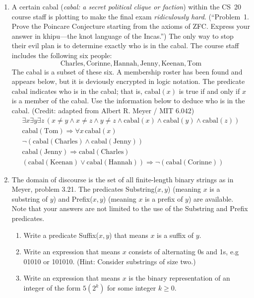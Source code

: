 \documentclass[12pt]{article}
\newcommand{\cabal}{\text{cabal}}
\newcommand{\PersonA}{\text{Charles}}
\newcommand{\PersonB}{\text{Corinne}}
\newcommand{\PersonC}{\text{Hannah}}
\newcommand{\PersonD}{\text{Jenny}}
\newcommand{\PersonE}{\text{Keenan}}
\newcommand{\PersonF}{\text{Tom}}
\begin{document}
\begin{enumerate}
\item A certain cabal (\emph{cabal: a secret political clique or faction})
 within the CS~20 course staff is
plotting to make the final exam \emph{ridiculously hard}.
(``Problem~1.  Prove the Poincare Conjecture starting from the axioms
of ZFC.  Express your answer in khipu---the knot language of the
Incas.'')  The only way to stop their evil plan is to determine
exactly who is in the cabal.  The course staff includes the following six
people: \[
\PersonA,\PersonB,\PersonC,\PersonD,\PersonE,\PersonF \]
The cabal is a subset of these six.  A membership roster has been
found and appears below, but it is deviously encrypted in logic
notation.  The predicate $\cabal$ indicates who is in the cabal; that is,
$\cabal(x)$ is true if and only if $x$ is a member of the cabal.  Use the information below 
to deduce who is in the cabal. (Credit: adapted from Albert R. Meyer / MIT 6.042)
\begin{gather}
\exists x\exists y\exists z \,
    (x \neq y \wedge
     x \neq z \wedge
     y \neq z \wedge
     \cabal(x) \wedge \cabal(y) \wedge \cabal(z))
\\
\cabal(\PersonF) \Rightarrow \forall x\, \cabal(x) \\ \lnot(\cabal(\PersonA) \wedge \cabal(\PersonD)) \\
\cabal(\PersonD) \Rightarrow \cabal(\PersonA)\\
(\cabal(\PersonE) \vee \cabal(\PersonC)) \Rightarrow \lnot(\cabal(\PersonB))
\end{gather}


\item The domain of discourse is the set of all finite-length binary strings as in Meyer, problem 3.21. The predicates Substring($x,y$) (meaning $x$ is a substring of $y$) and Prefix($x,y$) (meaning $x$ is a prefix of $y$) are available. Note that your answers are not limited to the use of the Substring and Prefix predicates.

\begin{enumerate}
\item Write a predicate Suffix($x, y$) that means $x$ is a suffix of $y$.


\item Write an expression that means $x$ consists of alternating 0s and 1s, e.g 01010 or 101010. (Hint: Consider substrings of size two.)


\item Write an expression that means $x$ is the binary representation of an integer of the form $5(2^k)$ for some integer $k \geq 0$.
\end{enumerate}

\end{enumerate}
\end{document}

